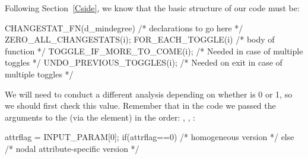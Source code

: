 \documentclass[nojss]{jss}
\begin{document}
Following Section~\ref{Cside}, we know that the basic structure of our
 code must be:
\begin{CodeChunk}
\begin{CodeInput}
CHANGESTAT_FN(d_mindegree) {
  /* declarations to go here */
  ZERO_ALL_CHANGESTATS(i);
  FOR_EACH_TOGGLE(i) {
    /* body of function */
    TOGGLE_IF_MORE_TO_COME(i); /* Needed in case of multiple toggles */
  }
  UNDO_PREVIOUS_TOGGLES(i); /* Needed on exit in case of multiple toggles */
}
\end{CodeInput}
\end{CodeChunk}

We will need to conduct a different analysis depending on whether
 is 0 or 1, so we should first check this value. Remember that in
the  code we passed the arguments to the  (via the
 element) in the order: , ,
:
\begin{CodeChunk}
\begin{CodeInput}
  attrflag = INPUT_PARAM[0];
  if(attrflag==0){
    /* homogeneous version */
  }else{
    /* nodal attribute-specific version */
  }
\end{CodeInput}
\end{CodeChunk}
\end{document}
